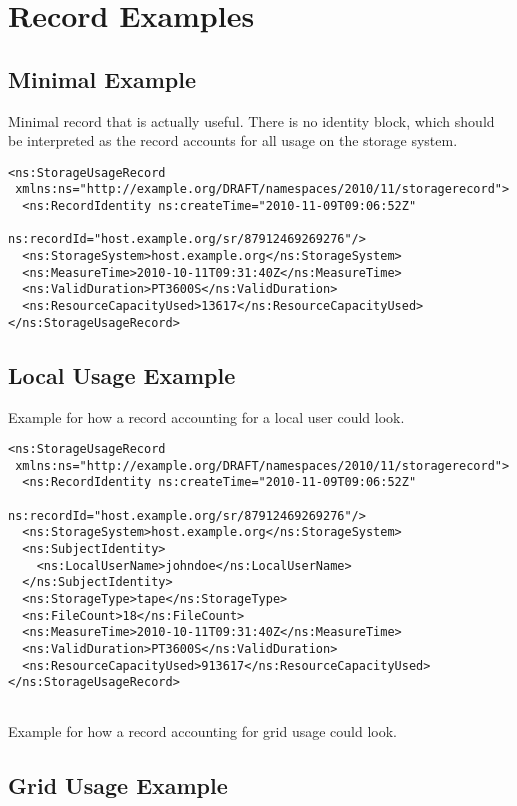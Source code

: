 
\section{Record Examples}
\label{sec:record-examples}


\subsection{Minimal Example}

Minimal record that is actually useful. There is no identity block, which should 
be interpreted as the record accounts for all usage on the storage
system.

\begin{verbatim}
<ns:StorageUsageRecord
 xmlns:ns="http://example.org/DRAFT/namespaces/2010/11/storagerecord">
  <ns:RecordIdentity ns:createTime="2010-11-09T09:06:52Z"
                     ns:recordId="host.example.org/sr/87912469269276"/>
  <ns:StorageSystem>host.example.org</ns:StorageSystem>
  <ns:MeasureTime>2010-10-11T09:31:40Z</ns:MeasureTime>
  <ns:ValidDuration>PT3600S</ns:ValidDuration>
  <ns:ResourceCapacityUsed>13617</ns:ResourceCapacityUsed>
</ns:StorageUsageRecord>
\end{verbatim}


\subsection{Local Usage Example}

Example for how a record accounting for a local user could look.

\begin{verbatim}
<ns:StorageUsageRecord
 xmlns:ns="http://example.org/DRAFT/namespaces/2010/11/storagerecord">
  <ns:RecordIdentity ns:createTime="2010-11-09T09:06:52Z"
                     ns:recordId="host.example.org/sr/87912469269276"/>
  <ns:StorageSystem>host.example.org</ns:StorageSystem>
  <ns:SubjectIdentity>
    <ns:LocalUserName>johndoe</ns:LocalUserName>
  </ns:SubjectIdentity>
  <ns:StorageType>tape</ns:StorageType>
  <ns:FileCount>18</ns:FileCount>
  <ns:MeasureTime>2010-10-11T09:31:40Z</ns:MeasureTime>
  <ns:ValidDuration>PT3600S</ns:ValidDuration>
  <ns:ResourceCapacityUsed>913617</ns:ResourceCapacityUsed>
</ns:StorageUsageRecord>


\end{verbatim}

Example for how a record accounting for grid usage could look.

\subsection{Grid Usage Example}

